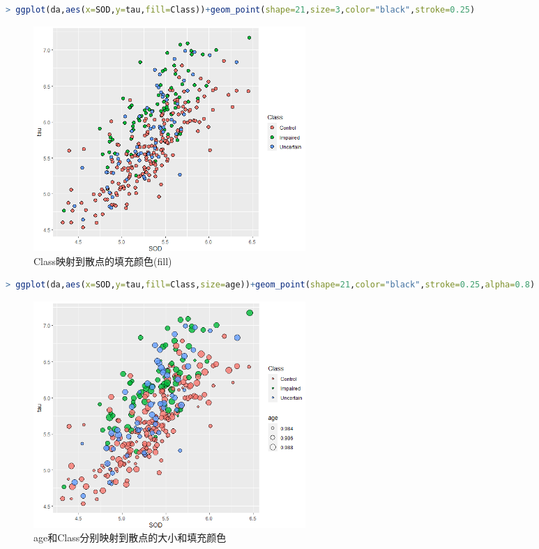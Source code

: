 \documentclass[11pt,a4paper,oneside]{book}
\begin{document}
\begin{multicols}{2} 
\begin{lstlisting}[language=r]
> ggplot(da,aes(x=SOD,y=tau,fill=Class))+geom_point(shape=21,size=3,color="black",stroke=0.25)
\end{lstlisting}
\begin{figure}[H]
	\centering
	\includegraphics[width=0.5\textwidth]{screenshot019}
	\caption{Class映射到散点的填充颜色(fill)}
	\label{fig:screenshot019}
\end{figure}
\end{multicols}
\begin{multicols}{2} 
\begin{lstlisting}[language=r]
> ggplot(da,aes(x=SOD,y=tau,fill=Class,size=age))+geom_point(shape=21,color="black",stroke=0.25,alpha=0.8)
\end{lstlisting}
\begin{figure}[H]
	\centering
	\includegraphics[width=0.5\textwidth]{screenshot020}
	\caption{age和Class分别映射到散点的大小和填充颜色}
	\label{fig:screenshot020}
\end{figure}
\end{multicols}
\end{document}
